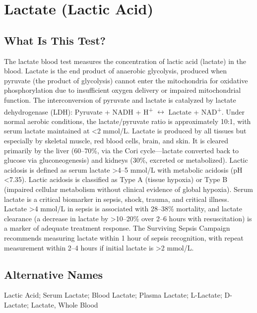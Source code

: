 \chapter{Lactate (Lactic Acid)}

\section*{What Is This Test?}
The lactate blood test measures the concentration of lactic acid (lactate) in the blood. Lactate is the end product of anaerobic glycolysis, produced when pyruvate (the product of glycolysis) cannot enter the mitochondria for oxidative phosphorylation due to insufficient oxygen delivery or impaired mitochondrial function. The interconversion of pyruvate and lactate is catalyzed by lactate dehydrogenase (LDH): Pyruvate + NADH + H\textsuperscript{+} $\leftrightarrow$ Lactate + NAD\textsuperscript{+}. Under normal aerobic conditions, the lactate/pyruvate ratio is approximately 10:1, with serum lactate maintained at <2 mmol/L. Lactate is produced by all tissues but especially by skeletal muscle, red blood cells, brain, and skin. It is cleared primarily by the liver (60--70\%, via the Cori cycle---lactate converted back to glucose via gluconeogenesis) and kidneys (30\%, excreted or metabolized). Lactic acidosis is defined as serum lactate >4--5 mmol/L with metabolic acidosis (pH <7.35). Lactic acidosis is classified as Type A (tissue hypoxia) or Type B (impaired cellular metabolism without clinical evidence of global hypoxia). Serum lactate is a critical biomarker in sepsis, shock, trauma, and critical illness. Lactate >4 mmol/L in sepsis is associated with 28--38\% mortality, and lactate clearance (a decrease in lactate by >10--20\% over 2--6 hours with resuscitation) is a marker of adequate treatment response. The Surviving Sepsis Campaign recommends measuring lactate within 1 hour of sepsis recognition, with repeat measurement within 2--4 hours if initial lactate is >2 mmol/L.

\section*{Alternative Names}
Lactic Acid; Serum Lactate; Blood Lactate; Plasma Lactate; L-Lactate; D-Lactate; Lactate, Whole Blood

